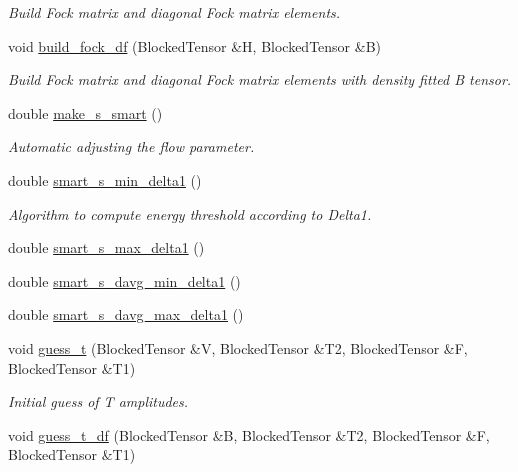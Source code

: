 \begin{DoxyCompactItemize}
\begin{DoxyCompactList}\small\item\em Build Fock matrix and diagonal Fock matrix elements. \end{DoxyCompactList}\item 
void \mbox{\hyperlink{classforte_1_1_m_r_d_s_r_g_a321d26cade11abd2ba7e992c3a917c5a}{build\+\_\+fock\+\_\+df}} (Blocked\+Tensor \&H, Blocked\+Tensor \&B)
\begin{DoxyCompactList}\small\item\em Build Fock matrix and diagonal Fock matrix elements with density fitted B tensor. \end{DoxyCompactList}\item 
double \mbox{\hyperlink{classforte_1_1_m_r_d_s_r_g_acc6165503dcfb05982436040aa40287a}{make\+\_\+s\+\_\+smart}} ()
\begin{DoxyCompactList}\small\item\em Automatic adjusting the flow parameter. \end{DoxyCompactList}\item 
double \mbox{\hyperlink{classforte_1_1_m_r_d_s_r_g_a95343fef9fd10ace3425ce091d1288b6}{smart\+\_\+s\+\_\+min\+\_\+delta1}} ()
\begin{DoxyCompactList}\small\item\em Algorithm to compute energy threshold according to Delta1. \end{DoxyCompactList}\item 
double \mbox{\hyperlink{classforte_1_1_m_r_d_s_r_g_af3ff801a919e2bb13162fb451de6d6fa}{smart\+\_\+s\+\_\+max\+\_\+delta1}} ()
\item 
double \mbox{\hyperlink{classforte_1_1_m_r_d_s_r_g_a87cbbb9f1d304e16cbc915481ac85c10}{smart\+\_\+s\+\_\+davg\+\_\+min\+\_\+delta1}} ()
\item 
double \mbox{\hyperlink{classforte_1_1_m_r_d_s_r_g_a5694577e3f4d5fdb3946c6cbf0a56ad2}{smart\+\_\+s\+\_\+davg\+\_\+max\+\_\+delta1}} ()
\item 
void \mbox{\hyperlink{classforte_1_1_m_r_d_s_r_g_ab2332cf8aaa8bdea5cd85618a98eddeb}{guess\+\_\+t}} (Blocked\+Tensor \&V, Blocked\+Tensor \&T2, Blocked\+Tensor \&F, Blocked\+Tensor \&T1)
\begin{DoxyCompactList}\small\item\em Initial guess of T amplitudes. \end{DoxyCompactList}\item 
void \mbox{\hyperlink{classforte_1_1_m_r_d_s_r_g_a4d74d0ac10cc8a26e00659b15e6fb9a6}{guess\+\_\+t\+\_\+df}} (Blocked\+Tensor \&B, Blocked\+Tensor \&T2, Blocked\+Tensor \&F, Blocked\+Tensor \&T1)

\end{DoxyCompactItemize}
